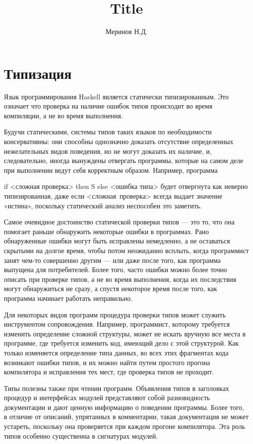 \documentclass[a4paper,12pt]{article}
\title{Title}
\date{}
\author{Меринов Н.Д.}
\newenvironment{code}{\footnotesize\verbatim}{\endverbatim\normalsize}
\begin{document}
\section{Типизация}

Язык программирования Haskell является статически типизированным. Это
означает что проверка на наличие ошибок типов происходит во время
компиляции, а не во время выполнения.

Будучи статическими, системы типов таких языков по необходимости
консервативны: они способны однозначно доказать отсутствие
определенных нежелательных видов поведения, но не могут доказать их
наличие, и, следовательно, иногда вынуждены отвергать программы,
которые на самом деле при выполнении ведут себя корректным
образом. Например, программа

\begin{code}
  if <сложная проверка> then S else <ошибка типа>
\end{code}
будет отвергнута как неверно типизированная, даже если
<сложная~проверка> всегда выдает значение «истина», поскольку
статический анализ неспособен это заметить.

Самое очевидное достоинство статической проверки типов — это то, что
она помогает раньше обнаружить некоторые ошибки в программах. Рано
обнаруженные ошибки могут быть исправлены немедленно, а не оставаться
скрытыми на долгое время, чтобы потом неожиданно всплыть, когда
программист занят чем-то совершенно другим — или даже после того, как
программа выпущена для потребителей. Более того, часто ошибки можно
более точно описать при проверке типов, а не во время выполнения,
когда их последствия могут обнаружиться не сразу, а спустя некоторое
время после того, как программа начинает работать неправильно.

Для некоторых видов программ процедура проверки типов может служить
инструментом сопровождения. Например, программист, которому требуется
изменить определение сложной структуры, может не искать вручную все
места в программе, где требуется изменить код, имеющий дело с этой
структурой. Как только изменяется определение типа данных, во всех
этих фрагментах кода возникают ошибки типов, и их можно найти путем
простого прогона компилятора и исправления тех мест, где проверка
типов не проходит.

Типы полезны также при чтении программ. Объявления типов в заголовках
процедур и интерфейсах модулей представляют собой разновидность
документации и дают ценную информацию о поведении программы. Более
того, в отличие от описаний, упрятанных в комментарии, такая
документация не может устареть, поскольку она проверяется при каждом
прогоне компилятора. Эта роль типов особенно существенна в сигнатурах
модулей.
\end{document}
